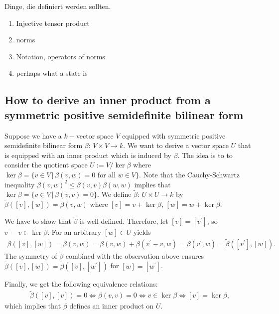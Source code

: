 Dinge, die definiert werden sollten. 
\begin{enumerate}
	\item Injective tensor product 
	\item norms
	\item Notation, operators of norms 
	\item  perhaps what a state is 
\end{enumerate}


\subsection{How to derive an inner product from a symmetric positive semidefinite bilinear form}
Suppose we have a $ k- $vector space $ V $ equipped with symmetric positive semidefinite bilinear form $ \beta: \, V \times V \to k $. We want to derive a vector space $ U $ that is equipped with an inner product which is induced by $ \beta $. The idea is to to consider the quotient space $ U:=V/\ker\beta $ where $ \ker \beta = \{ v \in V \, | \, \beta(v,w)= 0 \text{ for all } w \in V \} $. Note that the Cauchy-Schwartz inequality $ \beta(v,w)^2 \le \beta(v,v)\beta(w,w) $ implies that 
$ \ker \beta = \{ v \in V \, | \, \beta(v,v)= 0 \} $.
We define $ \tilde{\beta}:  \, U \times U \to k $ by $ \tilde{\beta}([v],[w]) = \beta(v,w) $ where $ [v] = v + \ker\beta, \,$$[w]=w+\ker\beta$.

We have to show that $ \tilde{\beta} $ is well-defined. Therefore, let $ [v]=[v^{'}] $, so $v^{‘}-v \in \ker \beta $. 
For an arbitrary $ [w] \in U $ yields 
\begin{align*}
	\beta([v],[w]) = \beta(v,w) = \beta(v,w)+\beta(v^{'}-v,w)= \beta(v^{'},w) = \tilde{\beta}([v^{'}],[w]).
\end{align*}
The symmetry of $ \beta $ combined with the observation above ensures $ \tilde{\beta}([v],[w]) = \tilde{\beta}([v],[w^{'}]) $ for $ [w]= [w^{'}] $.

Finally, we get the following equivalence relations: 
\begin{align*}
	\tilde{\beta}([v],[v]) = 0 \Leftrightarrow \beta(v,v) = 0 \Leftrightarrow v \in \ker \beta \Leftrightarrow [v]= \ker \beta,
\end{align*}
which implies that $ \beta $ defines an inner product on $ U $. 